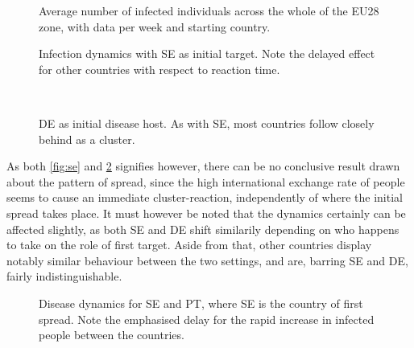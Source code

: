 \documentclass[a4paper,12pt]{article}
\theoremstyle{plain}
\theoremstyle{definition}
\begin{document}
   \begin{figure}[H]
      \centering
      \resizebox{\textwidth}{!}{}
      \caption{Average number of infected individuals across the whole of the
      EU28 zone, with data per week and starting country.}
      \label{fig:start}            
   \end{figure}

   \begin{figure}[H]
      \vspace*{1cm}
      \hspace*{-2cm}
      \centering
      \begin{minipage}[t]{.6\textwidth}		
         \vspace{0pt}
         \centering
          \resizebox{\columnwidth}{!}{}
          \caption{Infection dynamics with SE as initial target. Note the
          delayed effect for other countries with respect to reaction
          time.}
          \label{fig:se}
      \end{minipage}~\hspace*{1em}
      \begin{minipage}[t]{.6\textwidth}		
         \vspace{0pt}
         \centering
         \resizebox{\columnwidth}{!}{}
         \caption{DE as initial disease host. As with SE, most countries
         follow closely behind as a cluster.}
         \label{fig:de}
      \end{minipage}
   \end{figure}

   As both \cref{fig:se} and \cref{fig:de} signifies however, there can be no conclusive
   result drawn about the pattern of spread, since the high international
   exchange rate of people seems to cause an immediate cluster-reaction,
   independently of where the initial spread takes place. It must however be
   noted that the dynamics certainly can be affected slightly, as both SE and DE
   shift similarily depending on who happens to take on the role of first
   target. Aside from that, other countries display notably similar behaviour between
   the two settings, and are, barring SE and DE, fairly indistinguishable.

   \begin{figure}[H]
      \centering
      \resizebox{.6\textwidth}{!}{}
      \caption{Disease dynamics for SE and PT, where SE is the country of first
      spread. Note the emphasised delay for the rapid increase in infected
      people between the countries. }
      \label{fig:dyn}            
   \end{figure}
\end{document}
